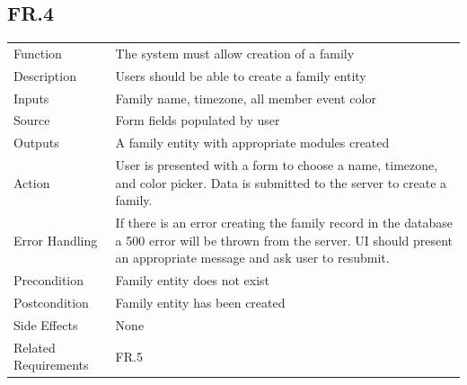 \documentclass[12pt]{article}
\begin{document}
    \subsection*{FR.4}
    \begin{center}
        \begin{tabular}{| p{10em} p{26em} |}
        \hline
         Function & The system must allow creation of a family\\
         Description & Users should be able to create a family entity \\
         Inputs & Family name, timezone, all member event color\\
         Source & Form fields populated by user\\
         Outputs & A family entity with appropriate modules created\\
         Action & User is presented with a form to choose a name, timezone, and color picker. Data is submitted to the server to create a family.\\
         Error Handling & If there is an error creating the family record in the database a 500 error will be thrown from the server. UI should present an appropriate message and ask user to resubmit.\\
         Precondition & Family entity does not exist\\
         Postcondition & Family entity has been created\\
         Side Effects & None\\
         Related Requirements & FR.5\\
         \hline
        \end{tabular}
    \end{center}
\end{document}
